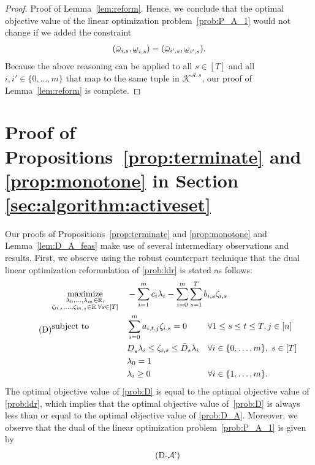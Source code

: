 \documentclass[nonblindrev,mnsc]{informs3} %
\def\Real{\mathbb{R}}
\let\R\Real
\newcommand{\ubar}[1]{\text{\b{$#1$}}}
\begin{document}
\begin{APPENDICES}
\begin{proof}{Proof of Lemma~\ref{lem:reform}.}
    Hence, we conclude that the optimal objective value of the linear optimization problem~\eqref{prob:P_A_1} would not change if we added the constraint
    $$(\bar{\omega}_{i,s}, \ubar{\omega}_{i,s}) = (\bar{\omega}_{i',s}, \ubar{\omega}_{i',s}).$$
    Because the above reasoning can be applied to all $s \in [T]$ and all $i,i' \in \{0,\ldots,m\}$ that map to the same tuple in $\mathcal{K}^{\mathcal{A},s}$, our proof of Lemma~\ref{lem:reform} is complete. 
\halmos \end{proof}
\section{Proof of Propositions~\ref{prop:terminate} and \ref{prop:monotone} in Section \ref{sec:algorithm:activeset}} \label{appx:D}
Our proofs of Propositions~\ref{prop:terminate} and \ref{prop:monotone} and Lemma~\ref{lem:D_A_feas} make use of several intermediary observations and results. First,  we observe using the robust counterpart technique that the dual linear optimization reformulation of \eqref{prob:ldr} is stated as follows:
 \begin{equation} \label{prob:D} \tag{D}
\begin{aligned}
&\underset{ \substack{
\lambda_0,\ldots,\lambda_m \in \R, \\
\zeta_{0,s},\ldots,\zeta_{m,s} \in \R \; \forall s \in [T]}}{\textnormal{maximize}}&& - \sum_{i=1}^m c_i \lambda_i - \sum_{i=0}^m \sum_{s=1}^T  b_{i,s} \zeta_{i,s}   \\
&\textnormal{subject to}&& \begin{aligned}[t]
&\sum_{i=0}^m   a_{i,t,j}  \zeta_{i,s}= 0 && \forall 1 \le s \le t \le T, j \in [n] \\
&  \ubar{D}_s \lambda_i  \le \zeta_{i,s} \le \bar{D}_s \lambda_i && \forall i \in \{0,\ldots,m\}, \; s \in [T]\\
& \lambda_0 = 1 \\
&\lambda_i \ge 0 && \forall i \in \{1,\ldots,m\}.  
\end{aligned}
\end{aligned} 
\end{equation} 
The optimal objective value of \eqref{prob:D} is equal to the optimal objective value of \eqref{prob:ldr}, which implies that the optimal objective value of~\eqref{prob:D} is always less than or equal to the optimal objective value of \eqref{prob:D_A}. Moreover, we observe that the dual of the linear optimization problem~\eqref{prob:P_A_1} is given by
 \begin{equation} \label{prob:D_A_1} \tag{D-$\mathcal{A}$'}

\end{equation}
\end{APPENDICES}
\end{document}

